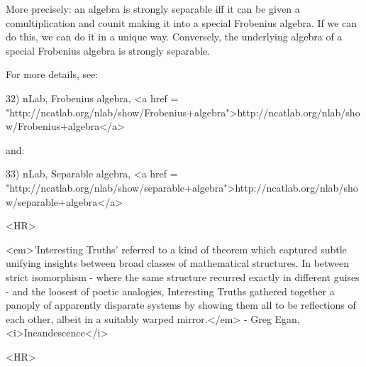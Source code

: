 More precisely: an algebra is strongly separable iff it can be given a
comultiplication and counit making it into a special Frobenius
algebra.  If we can do this, we can do it in a unique way.
Conversely, the underlying algebra of a special Frobenius algebra is
strongly separable.

For more details, see:

32) nLab, Frobenius algebra,
<a href = "http://ncatlab.org/nlab/show/Frobenius+algebra">http://ncatlab.org/nlab/show/Frobenius+algebra</a>

and: 

33) nLab, Separable algebra, <a href = "http://ncatlab.org/nlab/show/separable+algebra">http://ncatlab.org/nlab/show/separable+algebra</a>

<HR>
 
<em>'Interesting Truths' referred to a kind of theorem which
captured subtle unifying insights between broad classes of
mathematical structures. In between strict isomorphism - where the
same structure recurred exactly in different guises - and the loosest
of poetic analogies, Interesting Truths gathered together a panoply of
apparently disparate systems by showing them all to be reflections of
each other, albeit in a suitably warped mirror.</em> - Greg Egan,
<i>Incandescence</i>

<HR>



